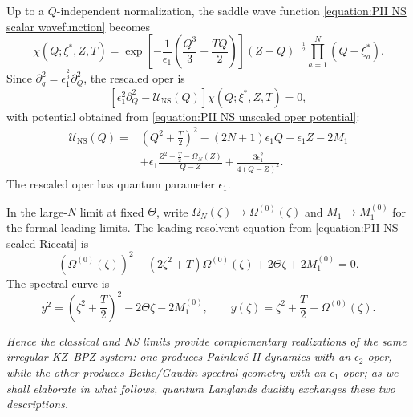 \documentclass[a4paper,11pt]{article}
\numberwithin{equation}{section}
\begin{document}
Up to a $Q$-independent normalization, the saddle wave function
\eqref{equation:PII NS scalar wavefunction} becomes
\begin{equation}
	\chi(Q;\xi^{*},Z,T)
	=\exp\left[-\frac{1}{\epsilon_{1}}
	\left(\frac{Q^{3}}{3}+\frac{TQ}{2}\right)\right]
	(Z-Q)^{-\frac{1}{2}}\prod_{a=1}^{N}(Q-\xi_{a}^{*}).
\end{equation}
Since $\partial_{q}^{2}=\epsilon_{1}^{\frac{2}{3}}\partial_{Q}^{2}$,
the rescaled oper is
\begin{equation}
	\left[\epsilon_{1}^{2}\partial_{Q}^{2}
	-\mathcal{U}_{\mathrm{NS}}(Q)\right]
	\chi(Q;\xi^{*},Z,T)=0,
\end{equation}
with potential obtained from
\eqref{equation:PII NS unscaled oper potential}:
\begin{equation}
	\label{equation:PII NS scaled oper}
	\begin{aligned}
		\mathcal{U}_{\mathrm{NS}}(Q)
		={}&\left(Q^{2}+\frac{T}{2}\right)^{2}
		-(2N+1)\epsilon_{1}Q+\epsilon_{1}Z-2M_{1}\\
		&+\epsilon_{1}
		\frac{Z^{2}+\frac{T}{2}-\Omega_{N}(Z)}{Q-Z}
		+\frac{3\epsilon_{1}^{2}}{4(Q-Z)^{2}}.
	\end{aligned}
\end{equation}
The rescaled oper has quantum parameter $\epsilon_{1}$.

In the large-$N$ limit at fixed $\Theta$, write
$\Omega_{N}(\zeta)\longrightarrow\Omega^{(0)}(\zeta)$ and
$M_{1}\longrightarrow M_{1}^{(0)}$ for the formal leading limits.
The leading resolvent equation from
\eqref{equation:PII NS scaled Riccati} is
\begin{equation}
	\label{equation:PII NS limiting Riccati}
	\left(\Omega^{(0)}(\zeta)\right)^{2}
	-(2\zeta^{2}+T)\Omega^{(0)}(\zeta)+2\Theta\zeta+2M_{1}^{(0)}=0.
\end{equation}
The spectral curve is
\begin{equation}
	y^{2}=\left(\zeta^{2}+\frac{T}{2}\right)^{2}-2\Theta\zeta-2M_{1}^{(0)},
	\qquad y(\zeta)=\zeta^{2}+\frac{T}{2}-\Omega^{(0)}(\zeta).
\end{equation}

{\it Hence the classical and NS limits provide complementary realizations of the same irregular KZ–BPZ system: one produces Painlev\'e II dynamics with an $\epsilon_2$-oper, while the other produces Bethe/Gaudin spectral geometry with an $\epsilon_1$-oper; as we shall elaborate in what follows, quantum Langlands duality exchanges these two descriptions.}
\end{document}
